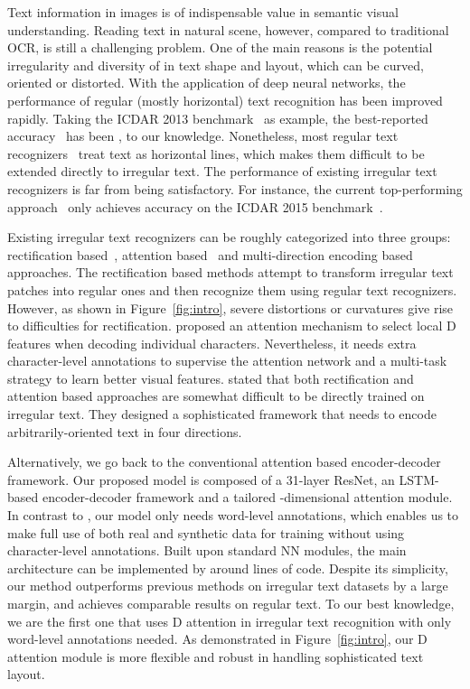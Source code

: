\documentclass[letterpaper]{article} \usepackage{aaai19}  \usepackage{times}  \usepackage{helvet}  \usepackage{courier}  \usepackage{url}  \usepackage{graphicx}  \usepackage{amsmath}
\begin{document}
Text information in images is of indispensable value in semantic visual understanding.
Reading text in natural scene, however, compared to traditional OCR, is still a challenging problem.
One of the main reasons is the potential irregularity and diversity of in text shape and layout, which can be curved, oriented or distorted.
With the application of deep neural networks, the performance of regular (mostly horizontal) text recognition has been improved rapidly. Taking the ICDAR 2013 benchmark~\cite{icdar2013} as example, the best-reported accuracy~\cite{cheng_EditDistance} has been , to our knowledge.
Nonetheless, most regular text recognizers~\cite{ShiBY15,OCRNIPS17} treat text as horizontal lines, which makes them difficult to be extended directly to irregular text.
The performance of existing irregular text recognizers is far from being satisfactory.
For instance, the current top-performing approach~\cite{shiPAMI2018} only achieves  accuracy on the ICDAR 2015 benchmark~\cite{icdar2015}.


Existing irregular text recognizers can be roughly categorized into three groups:
rectification based~\cite{shiCVPR2016,shiPAMI2018,BMVC2016_43,Liu2018CharNetAC}, attention based~\cite{ijcai2017,Cheng2017} and multi-direction encoding based~\cite{Cheng2018AON} approaches.
The rectification based methods attempt to transform irregular text patches into regular ones and then recognize them using regular text recognizers.
However, as shown in Figure~\ref{fig:intro}, severe distortions or curvatures give rise to difficulties for rectification.
\cite{ijcai2017} proposed an attention mechanism to select local D features when decoding individual characters.
Nevertheless, it needs extra character-level annotations to supervise the attention network and a multi-task strategy to learn better visual features.
\cite{Cheng2018AON} stated that both rectification and attention based approaches are somewhat difficult to be directly trained on irregular text.
They designed a sophisticated framework that needs to encode arbitrarily-oriented text in four directions.

Alternatively, we go back to the conventional attention based encoder-decoder framework.
Our proposed model is composed of a 31-layer ResNet, an LSTM-based encoder-decoder framework and a tailored -dimensional attention module.
In contrast to \cite{ijcai2017}, our model only needs word-level annotations, which enables us to make full use of both real and synthetic data for training without using character-level annotations.
Built upon standard NN modules, the main architecture can be implemented by around  lines of code.
Despite its simplicity, our method outperforms previous methods on irregular text datasets by a large margin,
and achieves comparable results on regular text. To our best knowledge, we are the first one that uses D attention in irregular text recognition with only word-level annotations needed.
As demonstrated in Figure~\ref{fig:intro}, our D attention module is more flexible and robust in handling sophisticated text layout.
\end{document}
